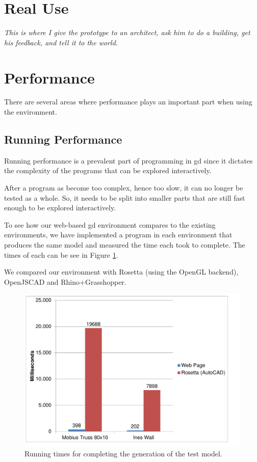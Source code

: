\section{Real Use}
{\it This is where I give the prototype to an architect, ask him to do a building, get his feedback, and tell it to the world.}


\section{Performance}
There are several areas where performance plays an important part when using the environment.


\subsection{Running Performance}
Running performance is a prevalent part of programming in \gls{gd} since it dictates the complexity of the programs that can be explored interactively.

After a program as become too complex, hence too slow, it can no longer be tested as a whole.
So, it needs to be split into smaller parts that are still fast enough to be explored interactively.

To see how our web-based \gls{gd} environment compares to the existing environments, we have implemented a program in each environment that produces the same model and measured the time each took to complete.
The times of each can be see in Figure \ref{fig:run:timing:chart}.

We compared our environment with Rosetta (using the OpenGL backend), OpenJSCAD and Rhino+Grasshopper.

\begin{figure}
  \centering
  \includegraphics[width=12cm]{./images/run_timing_chart}
  \caption{Running times for completing the generation of the test model.}
  \label{fig:run:timing:chart}
\end{figure}

